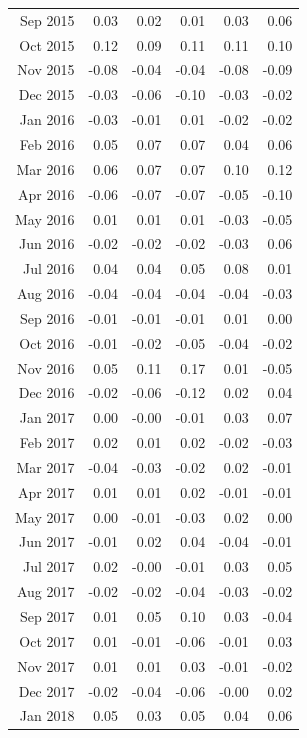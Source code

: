 \begin{tabularx}{\textwidth}{rrrrrr}
  Sep 2015 & 0.03 & 0.02 & 0.01 & 0.03 & 0.06 \\ 
  Oct 2015 & 0.12 & 0.09 & 0.11 & 0.11 & 0.10 \\ 
  Nov 2015 & -0.08 & -0.04 & -0.04 & -0.08 & -0.09 \\ 
  Dec 2015 & -0.03 & -0.06 & -0.10 & -0.03 & -0.02 \\ 
  Jan 2016 & -0.03 & -0.01 & 0.01 & -0.02 & -0.02 \\ 
  Feb 2016 & 0.05 & 0.07 & 0.07 & 0.04 & 0.06 \\ 
  Mar 2016 & 0.06 & 0.07 & 0.07 & 0.10 & 0.12 \\ 
  Apr 2016 & -0.06 & -0.07 & -0.07 & -0.05 & -0.10 \\ 
  May 2016 & 0.01 & 0.01 & 0.01 & -0.03 & -0.05 \\ 
  Jun 2016 & -0.02 & -0.02 & -0.02 & -0.03 & 0.06 \\ 
  Jul 2016 & 0.04 & 0.04 & 0.05 & 0.08 & 0.01 \\ 
  Aug 2016 & -0.04 & -0.04 & -0.04 & -0.04 & -0.03 \\ 
  Sep 2016 & -0.01 & -0.01 & -0.01 & 0.01 & 0.00 \\ 
  Oct 2016 & -0.01 & -0.02 & -0.05 & -0.04 & -0.02 \\ 
  Nov 2016 & 0.05 & 0.11 & 0.17 & 0.01 & -0.05 \\ 
  Dec 2016 & -0.02 & -0.06 & -0.12 & 0.02 & 0.04 \\ 
  Jan 2017 & 0.00 & -0.00 & -0.01 & 0.03 & 0.07 \\ 
  Feb 2017 & 0.02 & 0.01 & 0.02 & -0.02 & -0.03 \\ 
  Mar 2017 & -0.04 & -0.03 & -0.02 & 0.02 & -0.01 \\ 
  Apr 2017 & 0.01 & 0.01 & 0.02 & -0.01 & -0.01 \\ 
  May 2017 & 0.00 & -0.01 & -0.03 & 0.02 & 0.00 \\ 
  Jun 2017 & -0.01 & 0.02 & 0.04 & -0.04 & -0.01 \\ 
  Jul 2017 & 0.02 & -0.00 & -0.01 & 0.03 & 0.05 \\ 
  Aug 2017 & -0.02 & -0.02 & -0.04 & -0.03 & -0.02 \\ 
  Sep 2017 & 0.01 & 0.05 & 0.10 & 0.03 & -0.04 \\ 
  Oct 2017 & 0.01 & -0.01 & -0.06 & -0.01 & 0.03 \\ 
  Nov 2017 & 0.01 & 0.01 & 0.03 & -0.01 & -0.02 \\ 
  Dec 2017 & -0.02 & -0.04 & -0.06 & -0.00 & 0.02 \\ 
  Jan 2018 & 0.05 & 0.03 & 0.05 & 0.04 & 0.06 \\ 

\end{tabularx}

